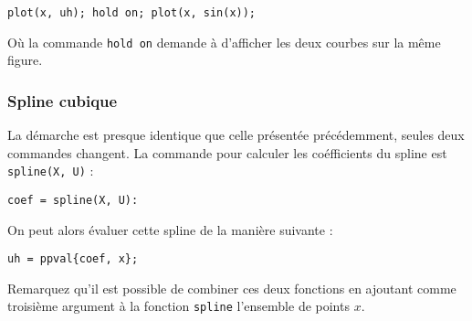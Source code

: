 \begin{lstlisting}
plot(x, uh); hold on; plot(x, sin(x));
\end{lstlisting}

Où la commande \lstinline{hold on} demande à \matlab{} d'afficher les deux courbes
sur la même figure.

\subsubsection{Spline cubique}
La démarche est presque identique que celle présentée précédemment, seules deux 
commandes changent. La commande pour calculer les coéfficients du spline
est \lstinline{spline(X, U)} :

\begin{lstlisting}
coef = spline(X, U):
\end{lstlisting}

On peut alors évaluer cette spline de la manière suivante :

\begin{lstlisting}
uh = ppval{coef, x}; 
\end{lstlisting}

Remarquez qu'il est possible de combiner ces deux fonctions en ajoutant comme
troisième argument à la fonction \lstinline{spline} l'ensemble de points $x$.

